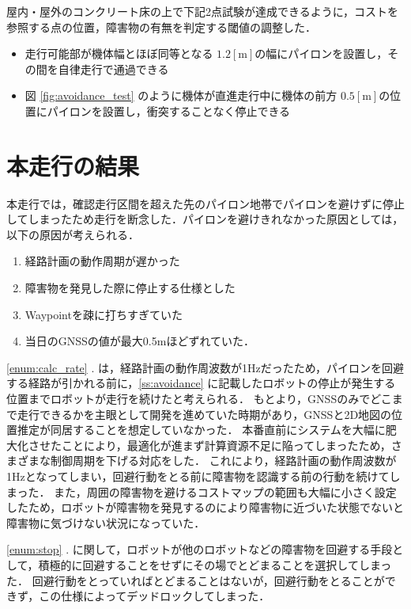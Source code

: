\documentclass[platex,dvipdfmx]{rbproceedings}
\begin{document}
屋内・屋外のコンクリート床の上で下記2点試験が達成できるように，コストを参照する点の位置，障害物の有無を判定する閾値の調整した．
\begin{itemize}
    \item 走行可能部が機体幅とほぼ同等となる $1.2[\mathrm{m}]$の幅にパイロンを設置し，その間を自律走行で通過できる
    \item 図 \ref{fig:avoidance_test} のように機体が直進走行中に機体の前方  $0.5[\mathrm{m}]$の位置にパイロンを設置し，衝突することなく停止できる
\end{itemize}

\section{本走行の結果}
本走行では，確認走行区間を超えた先のパイロン地帯でパイロンを避けずに停止してしまったため走行を断念した．パイロンを避けきれなかった原因としては，以下の原因が考えられる．

\begin{enumerate}
    \item 経路計画の動作周期が遅かった \label{enum:calc_rate}
    \item 障害物を発見した際に停止する仕様とした \label{enum:stop}
    \item Waypointを疎に打ちすぎていた \label{eunm:waypoint}
    \item 当日のGNSSの値が最大0.5mほどずれていた．\label{eunm:gnss}
\end{enumerate}

\ref{enum:calc_rate} . は，経路計画の動作周波数が1Hzだったため，パイロンを回避する経路が引かれる前に，\ref{ss:avoidance} に記載したロボットの停止が発生する位置までロボットが走行を続けたと考えられる．
もとより，GNSSのみでどこまで走行できるかを主眼として開発を進めていた時期があり，GNSSと2D地図の位置推定が同居することを想定していなかった．
本番直前にシステムを大幅に肥大化させたことにより，最適化が進まず計算資源不足に陥ってしまったため，さまざまな制御周期を下げる対応をした．
これにより，経路計画の動作周波数が1Hzとなってしまい，回避行動をとる前に障害物を認識する前の行動を続けてしまった．
また，周囲の障害物を避けるコストマップの範囲も大幅に小さく設定したため，ロボットが障害物を発見するのにより障害物に近づいた状態でないと障害物に気づけない状況になっていた．

\ref{enum:stop} . に関して，ロボットが他のロボットなどの障害物を回避する手段として，積極的に回避することをせずにその場でとどまることを選択してしまった．
回避行動をとっていればとどまることはないが，回避行動をとることができず，この仕様によってデッドロックしてしまった．
\end{document}
